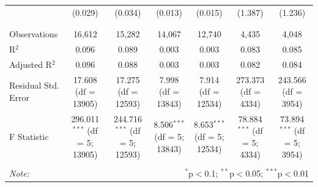 \documentclass{beamer}
\begin{document}
\begin{frame}
\begin{table}[!htbp]
{\begin{tabular}{@{\extracolsep{5pt}}lcccccc}
			& (0.029) & (0.034) & (0.013) & (0.015) & (1.387) & (1.236) \\ 
			& & & & & & \\ 
			\hline \\[-1.8ex] 
			Observations & 16,612 & 15,282 & 14,067 & 12,740 & 4,435 & 4,048 \\ 
			R$^{2}$ & 0.096 & 0.089 & 0.003 & 0.003 & 0.083 & 0.085 \\ 
			Adjusted R$^{2}$ & 0.096 & 0.088 & 0.003 & 0.003 & 0.082 & 0.084 \\ 
			Residual Std. Error & 17.608 (df = 13905) & 17.275 (df = 12593) & 7.998 (df = 13843) & 7.914 (df = 12534) & 273.373 (df = 4334) & 243.566 (df = 3954) \\ 
			F Statistic & 296.011$^{***}$ (df = 5; 13905) & 244.716$^{***}$ (df = 5; 12593) & 8.506$^{***}$ (df = 5; 13843) & 8.653$^{***}$ (df = 5; 12534) & 78.884$^{***}$ (df = 5; 4334) & 73.894$^{***}$ (df = 5; 3954) \\ 
			\hline 
			\hline \\[-1.8ex] 
			\textit{Note:}  & \multicolumn{6}{r}{$^{*}$p$<$0.1; $^{**}$p$<$0.05; $^{***}$p$<$0.01} \\ 
	\end{tabular} }
	\end{table} 
\end{frame}
\end{document}
